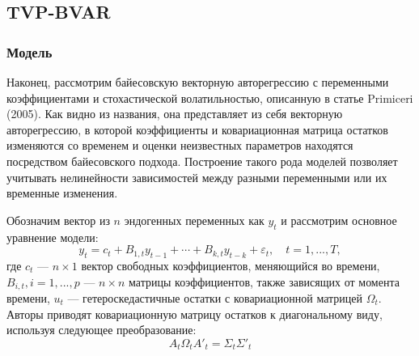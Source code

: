 \subsection{TVP-BVAR}
\subsubsection{Модель}
Наконец, рассмотрим байесовскую векторную авторегрессию с переменными коэффициентами и стохастической волатильностью, описанную в статье Primiceri (2005). Как видно из названия, она представляет из себя векторную авторегрессию, в которой коэффициенты и ковариационная матрица остатков изменяются со временем и оценки неизвестных параметров находятся посредством байесовского подхода. Построение такого рода моделей позволяет учитывать нелинейности зависимостей между разными переменными или их временные изменения.

Обозначим вектор из $n$ эндогенных переменных как $y_t$  и рассмотрим основное уравнение модели:
\begin{equation}\label{tvp1}
y_t = c_t + B_{1,t}y_{t-1} + \cdots + B_{k,t}y_{t-k} + \varepsilon_t, \quad t = 1,...,T,
\end{equation}
где $c_t$ --- $n \times 1$ вектор свободных коэффициентов, меняющийся во времени, $B_{i,t}, i = 1,...,p$ --- $n \times n$ матрицы коэффициентов, также зависящих от момента времени, $u_t$ --- гетероскедастичные остатки с ковариационной матрицей $\Omega_t$. Авторы приводят ковариационную матрицу остатков к диагональному виду, используя следующее преобразование:
\begin{equation}\label{error_decomp}
A_t \Omega_t A'_t = \Sigma_t\Sigma'_t
\end{equation}

